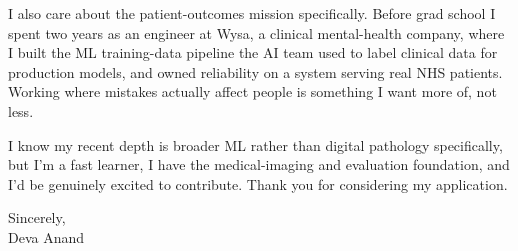 \documentclass[letterpaper,11pt]{article}
\begin{document}
I also care about the patient-outcomes mission specifically. Before grad school I spent two years as an engineer at Wysa, a clinical mental-health company, where I built the ML training-data pipeline the AI team used to label clinical data for production models, and owned reliability on a system serving real NHS patients. Working where mistakes actually affect people is something I want more of, not less.

I know my recent depth is broader ML rather than digital pathology specifically, but I'm a fast learner, I have the medical-imaging and evaluation foundation, and I'd be genuinely excited to contribute. Thank you for considering my application.

\vspace{8pt}
Sincerely, \\
Deva Anand
\end{document}
